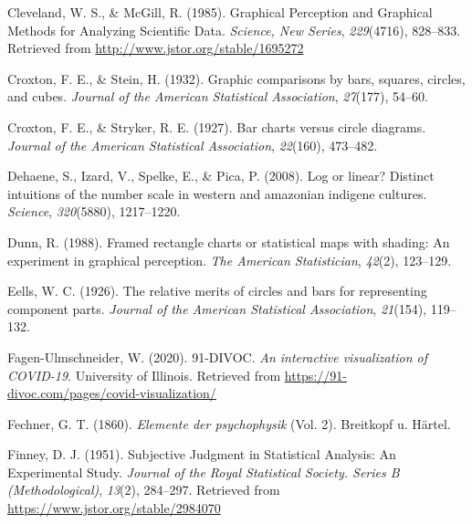 \documentclass[print]{nuthesis}
\newlength{\cslhangindent}
\newenvironment{CSLReferences}%
{\setlength{\parindent}{0pt}%
\everypar{\setlength{\hangindent}{\cslhangindent}}\ignorespaces}%
{\par}
\begin{document}
\begin{CSLReferences}{1}{0}
\leavevmode{}%
Cleveland, W. S., \& McGill, R. (1985). Graphical {Perception} and {Graphical} {Methods} for {Analyzing} {Scientific} {Data}. \emph{Science, New Series}, \emph{229}(4716), 828--833. Retrieved from \url{http://www.jstor.org/stable/1695272}

\leavevmode{}%
Croxton, F. E., \& Stein, H. (1932). Graphic comparisons by bars, squares, circles, and cubes. \emph{Journal of the American Statistical Association}, \emph{27}(177), 54--60.

\leavevmode{}%
Croxton, F. E., \& Stryker, R. E. (1927). Bar charts versus circle diagrams. \emph{Journal of the American Statistical Association}, \emph{22}(160), 473--482.

\leavevmode{}%
Dehaene, S., Izard, V., Spelke, E., \& Pica, P. (2008). Log or linear? Distinct intuitions of the number scale in western and amazonian indigene cultures. \emph{Science}, \emph{320}(5880), 1217--1220.

\leavevmode{}%
Dunn, R. (1988). Framed rectangle charts or statistical maps with shading: An experiment in graphical perception. \emph{The American Statistician}, \emph{42}(2), 123--129.

\leavevmode{}%
Eells, W. C. (1926). The relative merits of circles and bars for representing component parts. \emph{Journal of the American Statistical Association}, \emph{21}(154), 119--132.

\leavevmode{}%
Fagen-Ulmschneider, W. (2020). 91-DIVOC. \emph{An interactive visualization of COVID-19}. University of Illinois. Retrieved from \url{https://91-divoc.com/pages/covid-visualization/}

\leavevmode{}%
Fechner, G. T. (1860). \emph{Elemente der psychophysik} (Vol. 2). Breitkopf u. H{ä}rtel.

\leavevmode{}%
Finney, D. J. (1951). Subjective {Judgment} in {Statistical} {Analysis}: {An} {Experimental} {Study}. \emph{Journal of the Royal Statistical Society. Series B (Methodological)}, \emph{13}(2), 284--297. Retrieved from \url{https://www.jstor.org/stable/2984070}


\end{CSLReferences}
\end{document}
